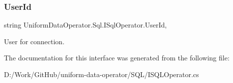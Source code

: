 \subsubsection{\texorpdfstring{User\+Id}{UserId}}
{\footnotesize\ttfamily string Uniform\+Data\+Operator.\+Sql.\+I\+Sql\+Operator.\+User\+Id\hspace{0.3cm}{\ttfamily [get]}, {\ttfamily [set]}}



User for connection. 



The documentation for this interface was generated from the following file\+:\begin{DoxyCompactItemize}
\item 
D\+:/\+Work/\+Git\+Hub/uniform-\/data-\/operator/\+S\+Q\+L/I\+S\+Q\+L\+Operator.\+cs\end{DoxyCompactItemize}
